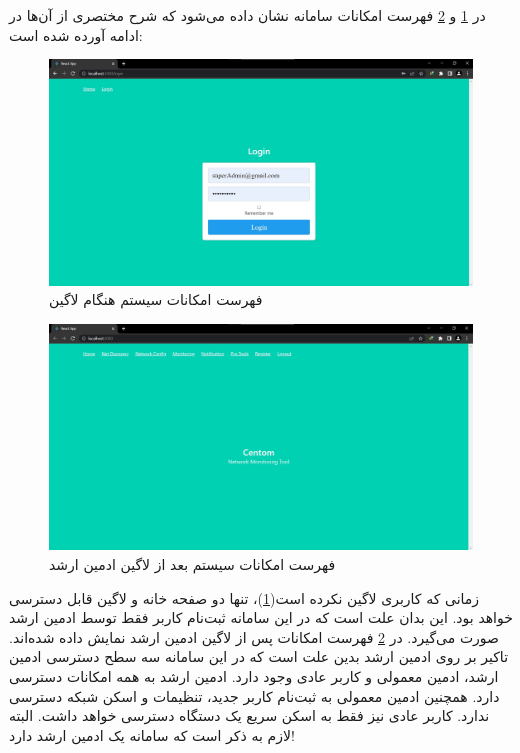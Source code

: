 در \cref{fig.12} و \cref{fig.13} فهرست امکانات سامانه نشان داده می‌شود که شرح مختصری از آن‌ها در ادامه آورده شده است:


\begin{figure}[!h]
    \centering\includegraphics[scale=.38]{./nav-logout}
    \caption{فهرست امکانات سیستم هنگام لاگین}\label{fig.12}
\end{figure}

\begin{figure}[!h]
    \centering\includegraphics[scale=.38]{./nav-login}
    \caption{فهرست امکانات سیستم بعد از لاگین ادمین ارشد}\label{fig.13}
\end{figure}
        
زمانی که کاربری لاگین نکرده است(\cref{fig.12})، تنها دو صفحه خانه و لاگین قابل دسترسی خواهد بود. این بدان علت است که در این سامانه ثبت‌نام کاربر فقط توسط ادمین ارشد صورت می‌گیرد. در \cref{fig.13} فهرست امکانات پس از لاگین ادمین ارشد نمایش داده شده‌اند. تاکیر بر روی ادمین ارشد بدین علت است که در این سامانه سه سطح دسترسی ادمین ارشد، ادمین معمولی و کاربر عادی وجود دارد. ادمین ارشد به همه امکانات دسترسی دارد. همچنین ادمین معمولی به ثبت‌نام کاربر جدید، تنظیمات و اسکن شبکه دسترسی ندارد. کاربر عادی نیز فقط به اسکن سریع یک دستگاه دسترسی خواهد داشت. البته لازم به ذکر است که سامانه یک ادمین ارشد دارد!

